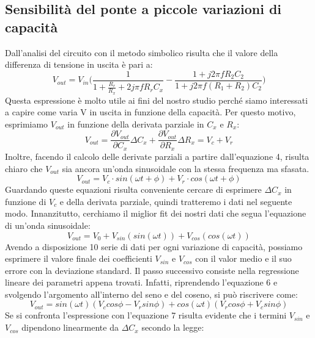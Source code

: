 \documentclass[12pt,]{article}
\begin{document}
\subsection{Sensibilità del ponte a piccole variazioni di capacità}
Dall'analisi del circuito con il metodo simbolico risulta che il valore della differenza di tensione in uscita è pari a: 
\begin{equation}
V_{out}= V_{in} \biggl(\frac{1}{1+ \frac{R_r}{R_x} + 2 j\pi f R_r C_x } - \frac{1+j 2 \pi f R_2 C_2}{1 + j 2 \pi f (R_1 + R_2 ) C_2} \biggr)
\end{equation}
Questa espressione è molto utile ai fini del nostro studio perché siamo interessati a capire come varia V in uscita in funzione della capacità. Per questo motivo, esprimiamo $V_{out}$ in funzione della derivata parziale in $C_x$ e $R_x$: 
\begin{equation}
V_{out}= \frac{\partial {V_{out}}}{\partial {C_x}} \Delta{C_x} + \frac{\partial {V_{out}}}{\partial {R_x}} \Delta{R_x} = V_c + V_r
\end{equation}
Inoltre, facendo il calcolo delle derivate parziali a partire dall'equazione 4, risulta chiaro che $V_{out}$ sia ancora un'onda sinusoidale con la stessa frequenza ma sfasata. 
\begin{equation}
V_{out} = V_c \cdot sin(\omega t + \phi) + V_r \cdot cos(\omega t + \phi)
\end{equation}
Guardando queste equazioni risulta conveniente cercare di esprimere $\Delta{C_x}$ in funzione di $V_c$ e della derivata parziale, quindi tratteremo i dati nel seguente modo. Innanzitutto, cerchiamo il miglior fit dei nostri dati che segua l'equazione di un'onda sinusoidale: 
\begin{equation}
V_{out}=V_0 + V_{sin} (sin (\omega t)) + V_{cos} (cos(\omega t))
\end{equation}
Avendo a disposizione 10 serie di dati per ogni variazione di capacità, possiamo esprimere il valore finale dei coefficienti $V_{sin}$ e $V_{cos}$ con il valor medio e il suo errore con la deviazione standard. \newline \break
Il passo successivo consiste nella regressione lineare dei parametri appena trovati. Infatti, riprendendo l'equazione 6 e svolgendo l'argomento all'interno del seno e del coseno, si può riscrivere come:
\begin{equation}
V_{out}= sin(\omega t) (V_c cos \phi - V_r sin \phi ) + cos (\omega t) (V_r cos \phi + V_c sin \phi)
\end{equation}
Se si confronta l'espressione con l'equazione 7 risulta evidente che i termini $V_{sin}$ e $V_{cos}$ dipendono linearmente da $\Delta{C_x}$ secondo la legge:
\end{document}
